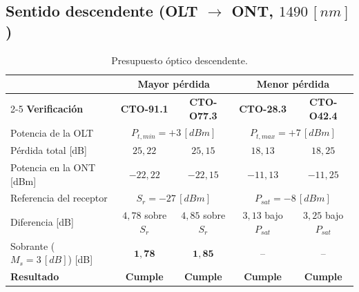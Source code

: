 \subsection{Sentido descendente (OLT $\rightarrow$ ONT, $1490 \, [nm]$)}
\label{sec:descendente}
\begin{table}[H]
    \centering
    \footnotesize
    \caption{Presupuesto óptico descendente.}
    \label{tab:descendente}
    \begin{tabular}{|l|c|c|c|c|}
        \hline
        & \multicolumn{2}{c|}{\textbf{Mayor pérdida}} & \multicolumn{2}{c|}{\textbf{Menor pérdida}} \\
        \cline{2-5}
        \textbf{Verificación} & \textbf{CTO-91.1} & \textbf{CTO-O77.3} & \textbf{CTO-28.3} & \textbf{CTO-O42.4} \\
        \hline
        Potencia de la OLT & \multicolumn{2}{c|}{$P_{t,min} = +3 \, [dBm]$} & \multicolumn{2}{c|}{$P_{t,max} = +7 \, [dBm]$} \\
        Pérdida total [dB] & $25{,}22$ & $25{,}15$ & $18{,}13$ & $18{,}25$ \\
        Potencia en la ONT [dBm] & $-22{,}22$ & $-22{,}15$ & $-11{,}13$ & $-11{,}25$ \\
        Referencia del receptor & \multicolumn{2}{c|}{$S_r = -27 \, [dBm]$} & \multicolumn{2}{c|}{$P_{sat} = -8 \, [dBm]$} \\
        Diferencia [dB] & $4{,}78$ sobre $S_r$ & $4{,}85$ sobre $S_r$ & $3{,}13$ bajo $P_{sat}$ & $3{,}25$ bajo $P_{sat}$ \\
        Sobrante ($M_s = 3 \, [dB]$) [dB] & $\mathbf{1{,}78}$ & $\mathbf{1{,}85}$ & -- & -- \\
        \hline
        \textbf{Resultado} & \textbf{Cumple} & \textbf{Cumple} & \textbf{Cumple} & \textbf{Cumple} \\
        \hline
    \end{tabular}
\end{table}

